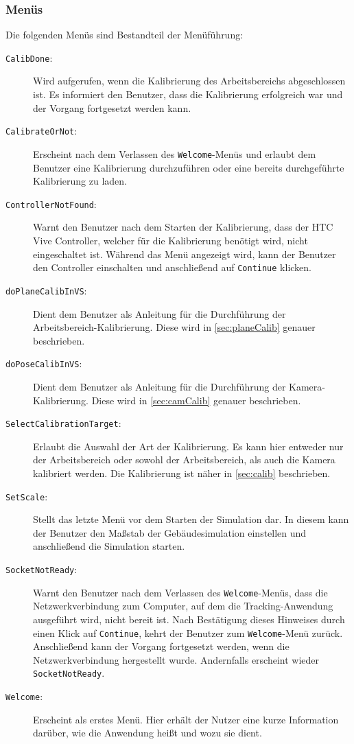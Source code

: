 \subsubsection{Menüs}\label{sec:menus}
Die folgenden Menüs sind Bestandteil der Menüführung:
\begin{description}
	\item[\texttt{CalibDone}:] Wird aufgerufen, wenn die Kalibrierung des Arbeitsbereichs abgeschlossen ist. Es informiert den Benutzer, dass die Kalibrierung erfolgreich war und der Vorgang fortgesetzt werden kann.
	\item[\texttt{CalibrateOrNot}:] Erscheint nach dem Verlassen des \texttt{Welcome}-Menüs und erlaubt dem Benutzer eine Kalibrierung durchzuführen oder eine bereits durchgeführte Kalibrierung zu laden.
	\item[\texttt{ControllerNotFound}:] Warnt den Benutzer nach dem Starten der Kalibrierung, dass der HTC Vive Controller, welcher für die Kalibrierung benötigt wird, nicht eingeschaltet ist. Während das Menü angezeigt wird, kann der Benutzer den Controller einschalten und anschließend auf \texttt{Continue} klicken.
	\item[\texttt{doPlaneCalibInVS}:] Dient dem Benutzer als Anleitung für die Durchführung der Arbeitsbereich-Kalibrierung. Diese wird in \ref{sec:planeCalib} genauer beschrieben.
	\item[\texttt{doPoseCalibInVS}:] Dient dem Benutzer als Anleitung für die Durchführung der Kamera-Kalibrierung. Diese wird in \ref{sec:camCalib} genauer beschrieben.
	\item[\texttt{SelectCalibrationTarget}:] Erlaubt die Auswahl der Art der Kalibrierung. Es kann hier entweder nur der Arbeitsbereich oder sowohl der Arbeitsbereich, als auch die Kamera kalibriert werden. Die Kalibrierung ist näher in \ref{sec:calib} beschrieben.
	\item[\texttt{SetScale}:] Stellt das letzte Menü vor dem Starten der Simulation dar. In diesem kann der Benutzer den Maßstab der Gebäudesimulation einstellen und anschließend die Simulation starten.
	\item[\texttt{SocketNotReady}:] Warnt den Benutzer nach dem Verlassen des \texttt{Welcome}-Menüs, dass die Netzwerkverbindung zum Computer, auf dem die Tracking-Anwendung ausgeführt wird, nicht bereit ist. Nach Bestätigung dieses Hinweises durch einen Klick auf \texttt{Continue}, kehrt der Benutzer zum \texttt{Welcome}-Menü zurück. Anschließend kann der Vorgang fortgesetzt werden, wenn die Netzwerkverbindung hergestellt wurde. Andernfalls erscheint wieder \texttt{SocketNotReady}.
	\item[\texttt{Welcome}:] Erscheint als erstes Menü. Hier erhält der Nutzer eine kurze Information darüber, wie die Anwendung heißt und wozu sie dient.
\end{description}

